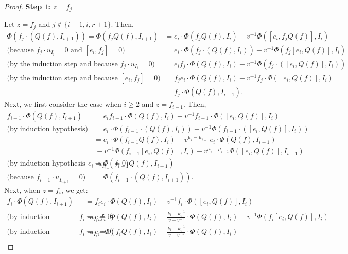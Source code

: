 \documentclass{amsart}
\numberwithin{equation}{section}
\theoremstyle{theorem}
\theoremstyle{definition}
\begin{document}
\begin{proof}
\underline{\textbf{Step $1$: $z=f_j$}}

Let $z=f_j$ and $j\not\in\{i-1,i,r+1\}$. Then,
\begin{align*}\Phi( f_j\cdot(Q(f),I_{i+1}))=\Phi( f_jQ(f),I_{i+1})&=e_i\cdot \Phi( f_jQ(f), I_i)-v^{-1}\Phi([e_i,f_jQ(f)], I_{i})\\
\text{(because $f_j\cdot u_{I_i}=0$ and $[e_i,f_j]=0$) }&=e_i\cdot \Phi(f_j\cdot(Q(f), I_i))-v^{-1}\Phi(f_j[e_i,Q(f)], I_{i})\\
\text{(by the induction step and because $f_j\cdot u_{I_i}=0$) }&=e_if_j\cdot \Phi(Q(f), I_i)-v^{-1}\Phi(f_j\cdot([e_i,Q(f)], I_{i}))\\
\text{(by the induction step and because $[e_i,f_j]=0$) }&=f_je_i\cdot \Phi(Q(f), I_i)-v^{-1}f_j\cdot\Phi([e_i,Q(f)], I_{i}) \\
&=  f_j\cdot\Phi(Q(f),I_{i+1}).\end{align*}
Next, we first consider the case when $i\geq 2$ and $z=f_{i-1}$. Then,
\begin{align*}
f_{i-1}\cdot\Phi( Q(f),I_{i+1})&=e_if_{i-1}\cdot \Phi( Q(f), I_i)-v^{-1}f_{i-1}\cdot\Phi([e_i,Q(f)], I_{i})\\
\text{(by induction hypothesis) }&=e_i\cdot \Phi(f_{i-1}\cdot( Q(f), I_i))-v^{-1}\Phi(f_{i-1}\cdot([e_i,Q(f)], I_{i}))\\
&=e_i\cdot \Phi(f_{i-1}Q(f),I_i) + v^{\mu_{i}-\mu_{i-1}}e_i\cdot \Phi(Q(f), I_{i-1})\\
&~-v^{-1}\Phi(f_{i-1}[e_i,Q(f)], I_{i})-v^{\mu_i-\mu_{i-1}}\Phi([e_i,Q(f)], I_{i-1})\\
\text{(by induction hypothesis and because $e_i\cdot u_{I_{i-1}}=0$) }&=\Phi(f_{i-1}Q(f), I_{i+1})\\
\text{(because $f_{i-1}\cdot u_{I_{i+1}}=0$) } &=\Phi(f_{i-1}\cdot(Q(f), I_{i+1})).
\end{align*}
Next, when $z=f_i$, we get:
\begin{align*}
f_{i}\cdot\Phi( Q(f),I_{i+1})&=f_ie_i\cdot \Phi( Q(f), I_i)-v^{-1}f_{i}\cdot\Phi([e_i,Q(f)], I_{i})\\
\text{(by induction hypothesis and because $f_i\cdot u_{I_i}=0$) }&=e_if_i\cdot \Phi( Q(f), I_i)-\frac{k_i-k_i^{-1}}{v-v^{-1}}\cdot \Phi( Q(f), I_i)-v^{-1}\Phi(f_i[e_i,Q(f)], I_{i})\\
\text{(by induction hypothesis and because $f_i\cdot u_{I_i}=0$) }&=e_i\cdot \Phi(f_iQ(f), I_i)-\frac{k_i-k_i^{-1}}{v-v^{-1}}\cdot \Phi( Q(f), I_i)\\

\end{align*}
\end{proof}
\end{document}
